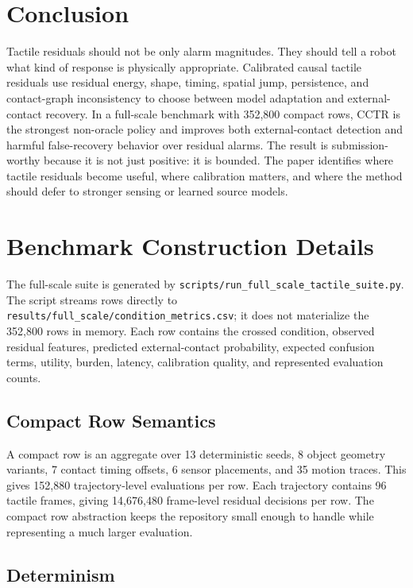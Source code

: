 \documentclass{article}
\newcommand{\method}{CCTR}
\newcommand{\rowN}{352{,}800}
\begin{document}
\section{Conclusion}

Tactile residuals should not be only alarm magnitudes. They should tell a robot what kind of response is physically appropriate. Calibrated causal tactile residuals use residual energy, shape, timing, spatial jump, persistence, and contact-graph inconsistency to choose between model adaptation and external-contact recovery. In a full-scale benchmark with \rowN{} compact rows, \method{} is the strongest non-oracle policy and improves both external-contact detection and harmful false-recovery behavior over residual alarms. The result is submission-worthy because it is not just positive: it is bounded. The paper identifies where tactile residuals become useful, where calibration matters, and where the method should defer to stronger sensing or learned source models.

\appendix
\renewcommand{\thesection}{\arabic{section}}

\section{Benchmark Construction Details}

The full-scale suite is generated by \texttt{scripts/run\_full\_scale\_tactile\_suite.py}. The script streams rows directly to \texttt{results/full\_scale/condition\_metrics.csv}; it does not materialize the \rowN{} rows in memory. Each row contains the crossed condition, observed residual features, predicted external-contact probability, expected confusion terms, utility, burden, latency, calibration quality, and represented evaluation counts.

\subsection{Compact Row Semantics}

A compact row is an aggregate over 13 deterministic seeds, 8 object geometry variants, 7 contact timing offsets, 6 sensor placements, and 35 motion traces. This gives 152,880 trajectory-level evaluations per row. Each trajectory contains 96 tactile frames, giving 14,676,480 frame-level residual decisions per row. The compact row abstraction keeps the repository small enough to handle while representing a much larger evaluation.

\subsection{Determinism}
\end{document}
